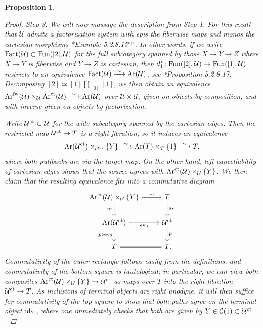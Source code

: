 \documentclass[reqno]{memo-l}
\theoremstyle{mythm}
\newtheorem{prop}[thm]{Proposition}
\theoremstyle{definition}
\numberwithin{equation}{section}
\newcommand{\Cc}{{\mathcal{C}}}
\newcommand{\Uu}{{\mathcal{U}}}
\DeclareMathOperator{\ev}{ev}
\newcommand{\Fun}{{\textup{Fun}}}
\DeclareMathOperator{\Ar}{Ar}
\newcommand{\op}{{\textup{op}}}
\newcommand{\id}{\textup{id}}
\newcommand{\pr}{\textup{pr}}
\newcommand{\ct}{\textup{ct}}
\newcommand{\iso}{\xrightarrow{\;\smash{\raisebox{-0.25ex}{\ensuremath{\scriptstyle\sim}}}\;}}
\begin{document}
\begin{prop}
\begin{proof}
        \smallskip
        \textit{Step 3.} We will now massage the description from Step 1. For this recall that $\Uu$ admits a factorization system with epis the fiberwise maps and monos the cartesian morphisms \cite{HTT}*{Example 5.2.8.15${}^\op$}. In other words, if we write $\text{Fact}(\Uu)\subset\Fun([2],\Uu)$ for the full subcategory spanned by those $X\to Y\to Z$ where $X\to Y$ is fiberwise and $Y\to Z$ is cartesian, then $d_1^*\colon\Fun([2],\Uu)\to\Fun([1],\Uu)$ restricts to an equivalence $\text{Fact}(\Uu)\iso\Ar(\Uu)$, see \cite{HTT}*{Proposition 5.2.8.17}. Decomposing $[2]\simeq[1]\amalg_{[0]}[1]$, we then obtain an equivalence $\Ar^\text{fw}(\Uu)\times_\Uu\Ar^\ct(\Uu)\iso\Ar(\Uu)$ over $\Uu\times\Uu$, given on objects by composition, and with inverse given on objects by factorization.

        Write $\Uu^\ct\subset\Uu$ for the wide subcategory spanned by the cartesian edges. Then the restricted map $\Uu^\ct\to T$ is a right fibration, so it induces an equivalence
        \[
           \Ar(\Uu^\ct)\times_{\Uu^\ct}\{Y\}\iso\Ar(T)\times_T\{1\}\iso T,
        \]
        where both pullbacks are via the target map. On the other hand, left cancellability of cartesian edges shows that the source agrees with $\Ar^\ct(\Uu)\times_{\Uu}\{Y\}$. We then claim that the resulting equivalence fits into a commutative diagram
        \[
            \begin{tikzcd}
                \arrow[d,"\pr"']\Ar^\ct(\Uu)\times_\Uu \{Y\}\arrow[r,"\sim"] & T\arrow[d,"s_Y"]\\
                \Ar(\Uu^\ct)\arrow[r,"\ev_0"']\arrow[d,"p\circ\ev_0"'] & \Uu^\ct\arrow[d,"p"]\\
                T\arrow[r,equals] & T\rlap.
            \end{tikzcd}
        \]
        Commutativity of the outer rectangle follows easily from the definitions, and commutativity of the bottom square is tautological; in particular, we can view both composites $\Ar^\ct(\Uu)\times_\Uu\{Y\}\to\Uu^\ct$ as maps over $T$ into the right fibration $\Uu^\ct\to T$. As inclusions of terminal objects are right anodyne, it will then suffice for commutativity of the top square to show that both paths agree on the terminal object $\id_Y$, where one immediately checks that both are given by $Y\in\Cc(1)\subset\Uu^\ct$.


\end{proof}
\end{prop}
\end{document}
